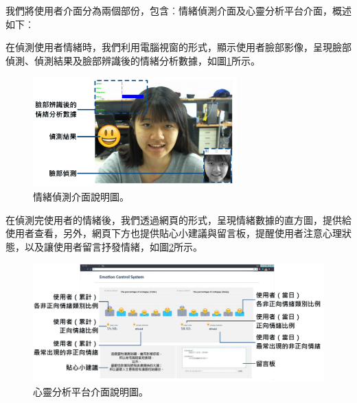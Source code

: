 \documentclass[12pt]{scrreprt}
\begin{document}
我們將使用者介面分為兩個部份，包含︰情緒偵測介面及心靈分析平台介面，概述如下︰

在偵測使用者情緒時，我們利用電腦視窗的形式，顯示使用者臉部影像，呈現臉部偵測、偵測結果及臉部辨識後的情緒分析數據，如圖\ref{fig:UserInterface-1}所示。
\begin{figure}[!h]
\begin{center}
\includegraphics[width=0.7\textwidth]{./figs/DetectResult-2.pdf}
\end{center}
\caption{情緒偵測介面說明圖。}
\label{fig:UserInterface-1}
\end{figure}

在偵測完使用者的情緒後，我們透過網頁的形式，呈現情緒數據的直方圖，提供給使用者查看，另外，網頁下方也提供貼心小建議與留言板，提醒使用者注意心理狀態，以及讓使用者留言抒發情緒，如圖\ref{fig:UserInterface-2}所示。

\begin{figure}[!h]
\begin{center}
\includegraphics[width=1\textwidth]{./figs/Web.pdf}
\end{center}
\caption{心靈分析平台介面說明圖。}
\label{fig:UserInterface-2}
\end{figure}
\end{document}
